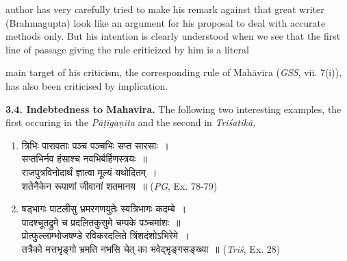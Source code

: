 \documentclass[10pt, openany]{book}
\begin{document}
{author has very carefully tried to make his remark against}
{that great writer (Brahmagupta) look like an argument for his}
{proposal to deal with accurate methods only. But his intention}
{is clearly understood when we see that the first line of}
{passage giving the rule criticized by him is a literal}

\newpage

\englishfont{}

\vspace{0.3cm}{Although Śrīdharācārya has made Brahmagupta the}
{main target of his criticism, the corresponding rule of Mahāvīra}
{(\textit{GSS}, vii. 7(i)), has also been criticised by implication.}

{\vspace{0.3cm} \textbf{3.4. Indebtedness to Mahavira. }The following two}
{interesting examples, the first occuring in the \textit{Pāṭīgaṇita }and}
{the second in \textit{Triśatikā,}}

\begin{enumerate}[(1)]
\item {\qt त्रिभिः पारावताः पञ्च पञ्चभिः सप्त सारसाः~।\\
    सप्तभिर्नव हंसाश्च नवभिर्बर्हिणस्त्रयः~॥\\
    राजपुत्रविनोदार्थं ज्ञात्वा मूल्यं यथोदितम्~।\\
    शतेनैकेन रूपाणां जीवानां शतमानय~॥} \hfill \englishfont(\emph{PG}, Ex. 78-79)
\item {\qt षड्भागः पाटलीसु भ्रमरगणयुतेः स्वत्रिभागः कदम्बे~।\\
पादश्चूतद्रुमे च प्रदलितकुसुमे चम्पके पञ्चमांशः~॥\\
प्रोत्फुल्लाम्भोजषण्डे रविकरदलिते त्रिंशदंशोऽभिरेमे~।\\
तत्रैको मत्तभृङ्गो भ्रमति नभसि चेत् का भवेद्भृङ्गसङ्ख्या~॥} \hfill \englishfont (\emph{Triś}, Ex. 28)
\end{enumerate}

\justify{}
\end{document}
